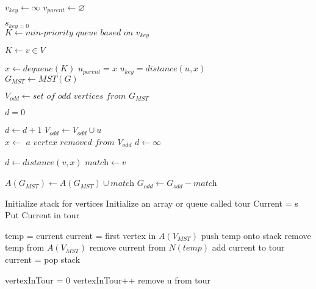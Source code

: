 \documentclass{article}
\begin{document}
  \begin{algorithmic}[1]

      \State $v_{\textit{key}} \gets \infty$
      \State $v_{\textit{parent}} \gets \varnothing$
    \EndFor

    \State $s_{\textit{key} = 0}$
    \\
    \State $K \gets \textit{min-priority queue based on } v_{\textit{key}}$

    \State $K \gets {v \in V}$

      \State $x \gets \textit{dequeue}(K)$
          \State $u_{\textit{parent}} = x$
          \State $u_{\textit{key}} = \textit{distance}(u, x)$
        \EndIf
      \EndFor
    \EndWhile
    \\
    \State $G_{MST} \gets \textit{MST}(G)$

    \State $V_{\textit{odd}} \gets \textit{set of odd vertices from }G_{MST}$

      \State $d = 0$

        \State $d \gets d + 1$
          \State $V_{\textit{odd}} \gets V_{\textit{odd}} \cup u$
        \EndIf
      \EndFor
    \EndFor
    \\
      \State $x \gets \textit{ a vertex removed from } V_{\textit{odd}}$
      \State $d \gets \infty$


          \State $d \gets \textit{distance}(v, x)$
          \State $\textit{match} \gets v$
        \EndIf

        \State $A(G_{MST}) \gets A(G_{MST}) \cup \textit{match}$
        \State $G_{\textit{odd}} \gets G_{\textit{odd}} - \textit{match}$

      \EndFor

    \EndWhile

    \State Initialize stack for vertices
    \State Initialize an array or queue called tour
    \State Current = s
    \State Put Current in tour

        \State temp = current
        \State current = first vertex in $A(V_{MST})$
        \State push temp onto stack
        \State remove temp from $A(V_{MST})$
        \State remove current from $N(temp)$
      \Else
        \State add current to tour
        \State current = pop stack
      \EndIf
    \EndWhile

      \State vertexInTour = 0
          \State vertexInTour++
        \EndIf
          \State remove u from tour
        \EndIf
      \EndFor
    \EndFor
    \EndProcedure
  \end{algorithmic}
\par
\FloatBarrier

\clearpage
\newpage
\end{document}
